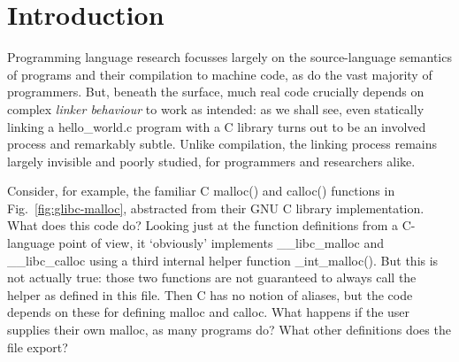 \documentclass[preprint,10pt]{sigplanconf-pldi16}
\begin{document}
\begin{abstract}



\end{abstract}

\section{Introduction}

Programming language research focusses largely on the source-language
semantics of programs and their compilation to machine code, as do the
vast majority of programmers.
But, beneath the surface, much real code crucially depends on complex
\emph{linker behaviour} to work as intended:  as we shall see, even statically linking
a \textsf{hello\_world.c} program with a C library turns out to be an involved process and
remarkably subtle.  
%
Unlike compilation, the linking process remains largely invisible and
poorly studied, %
for programmers and researchers alike.

Consider, for example, the familiar C \textsf{malloc()} and \textsf{calloc()}
functions in Fig.~\ref{fig:glibc-malloc}, abstracted from their GNU C
library implementation.
What does this code do?
Looking just at the function definitions from a C-language point of view, it `obviously' implements 
\textsf{\_\_libc\_malloc} and \textsf{\_\_libc\_calloc} using a third
internal helper function \textsf{\_int\_malloc()}.
%
But this is not actually true: those two functions are not guaranteed
to always call the helper as defined in this file.  
%
Then C has no notion of aliases, 
but the code depends on these for defining \textsf{malloc} and \textsf{calloc}.
What happens if the user supplies their own \textsf{malloc}, as many
programs do?  What other definitions does the file export?
\end{document}
